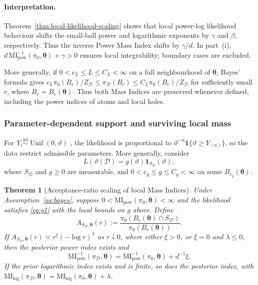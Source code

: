 \documentclass[11pt,a4paper]{article}
\newcommand{\MI}{\mathrm{MI}}
\newcommand{\pa}{\boldsymbol\theta}
\theoremstyle{compactplain}
\newtheorem{theorem}{Theorem}[section]
\theoremstyle{compactdefinition}
\numberwithin{equation}{section}
\begin{document}
\paragraph{Interpretation.}
Theorem~\ref{thm:local-likelihood-scaling} shows that local power-log likelihood behaviour shifts the small-ball power and logarithmic exponents by \(\gamma\) and \(\beta\), respectively. Thus the inverse Power Mass Index shifts by \(\gamma/d\). In part~\textnormal{(i)},
\(d\,\MI^{-1}_{\mathrm{pow}}(\pi_0,\pa)+\gamma>0\)
ensures local integrability; boundary cases are excluded.

More generally, if \(0<c_L\le L\le C_L<\infty\) on a full neighbourhood of \(\pa\), Bayes' formula gives \(c_L\pi_0(B_r)/Z_{\mathcal D}\le\pi_{\mathcal D}(B_r)\le C_L\pi_0(B_r)/Z_{\mathcal D}\) for sufficiently small \(r\), where \(B_r=B_r(\pa)\). Thus both Mass Indices are preserved whenever defined, including the power indices of atoms and local holes.

\subsubsection{Parameter-dependent support and surviving local mass}

For \(Y_i\stackrel{\mathrm{iid}}{\sim}\operatorname{Unif}(0,\vartheta)\) \cite{hirano2003asymptotic}, the likelihood is proportional to \(\vartheta^{-n}\mathbf1\{\vartheta\ge Y_{(n)}\}\), so the data restrict admissible parameters. More generally, consider
\begin{equation}\label{eq:g1}
L(\vartheta\mid\mathcal D)=g(\vartheta)\mathbf1_{S_{\mathcal D}}(\vartheta),
\end{equation}
where \(S_{\mathcal D}\) and \(g\ge0\) are measurable, and \(0<c_g\le g\le C_g<\infty\) on some \(B_{r_g}(\pa)\).

\begin{theorem}[Acceptance-ratio scaling of local Mass Indices]\label{thm:acceptance}
Under Assumption~\ref{as:bayes}, suppose \(0<\MI_{\mathrm{pow}}(\pi_0,\pa)<\infty\) and the likelihood satisfies \eqref{eq:g1} with the local bounds on \(g\) above. Define
\[
A_{S_{\mathcal D},\pa}(r):=
\frac{\pi_0(B_r(\pa)\cap S_{\mathcal D})}{\pi_0(B_r(\pa))}.
\]
If \(A_{S_{\mathcal D},\pa}(r)\asymp r^\xi(-\log r)^\lambda\) as \(r\downarrow0\), where either \(\xi>0\), or \(\xi=0\) and \(\lambda\le0\), then the posterior power index exists and
\[
\MI_{\mathrm{pow}}^{-1}(\pi_{\mathcal D},\pa)
=\MI_{\mathrm{pow}}^{-1}(\pi_0,\pa)+d^{-1}\xi.
\]
If the prior logarithmic index exists and is finite, so does the posterior index, with
\(\MI_{\mathrm{log}}(\pi_{\mathcal D},\pa) =\MI_{\mathrm{log}}(\pi_0,\pa)+\lambda\).
\end{theorem}
\end{document}

